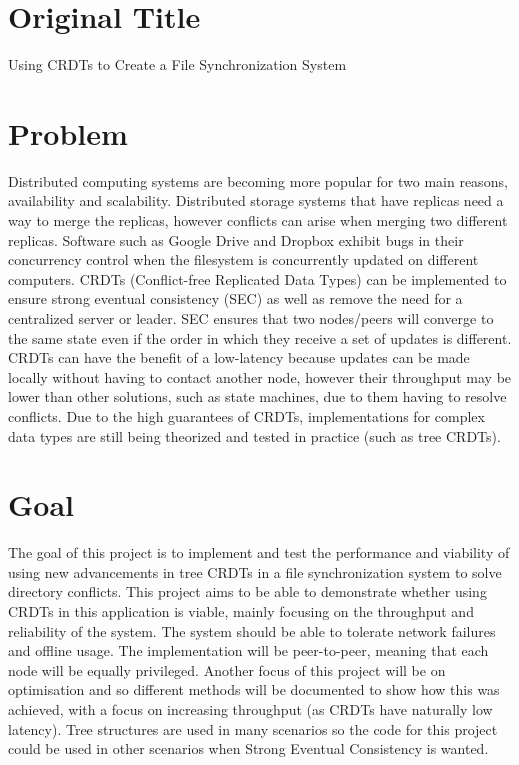 \documentclass[12pt]{report}
\begin{document}
\section{Original Title}
\begin{center}
Using CRDTs to Create a File Synchronization System
\end{center}

\section{Problem}
Distributed computing systems are becoming more popular for two main reasons, availability
and scalability. Distributed storage systems that have replicas need a way to merge the replicas,
however conflicts can arise when merging two different replicas. Software such as Google Drive
and Dropbox exhibit bugs in their concurrency control when the filesystem is concurrently
updated on different computers. CRDTs (Conflict-free Replicated Data Types) can be
implemented to ensure strong eventual consistency (SEC) as well as remove the need for a
centralized server or leader. SEC ensures that two nodes/peers will converge to the same state
even if the order in which they receive a set of updates is different. CRDTs can have the benefit
of a low-latency because updates can be made locally without having to contact another node,
however their throughput may be lower than other solutions, such as state machines, due to
them having to resolve conflicts. Due to the high guarantees of CRDTs, implementations for
complex data types are still being theorized and tested in practice (such as tree CRDTs).

\section{Goal} 
The goal of this project is to implement and test the performance and viability of using new
advancements in tree CRDTs in a file synchronization system to solve directory conflicts. This
project aims to be able to demonstrate whether using CRDTs in this application is viable, mainly
focusing on the throughput and reliability of the system. The system should be able to tolerate
network failures and offline usage. The implementation will be peer-to-peer, meaning that each
node will be equally privileged. Another focus of this project will be on optimisation and so
different methods will be documented to show how this was achieved, with a focus on
increasing throughput (as CRDTs have naturally low latency).
Tree structures are used in many scenarios so the code for this project could be used in other
scenarios when Strong Eventual Consistency is wanted.
\end{document}
